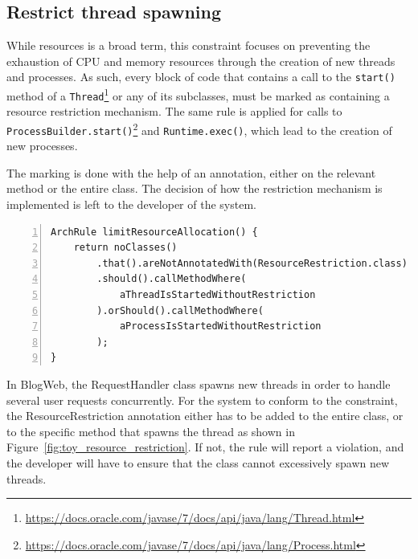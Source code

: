 \subsection{Restrict thread spawning}
While resources is a broad term, this constraint focuses on preventing the exhaustion of CPU and memory resources through the creation of new threads and processes. As such, every block of code that contains a call to the \texttt{start()} method of a \texttt{Thread}\footnote{\url{https://docs.oracle.com/javase/7/docs/api/java/lang/Thread.html}} or any of its subclasses, must be marked as containing a resource restriction mechanism. The same rule is applied for calls to \texttt{ProcessBuilder.start()}\footnote{\url{https://docs.oracle.com/javase/7/docs/api/java/lang/Process.html}\label{fnt:java_process}} and \texttt{Runtime.exec()}, which lead to the creation of new processes.

The marking is done with the help of an annotation, either on the relevant method or the entire class. The decision of how the restriction mechanism is implemented is left to the developer of the system.

\begin{minipage}{\linewidth}
\begin{lstlisting}[caption={Rule definition for constraint 5.}, captionpos=b, label=lst:constraint_5_impl, numbers=left]
ArchRule limitResourceAllocation() {
    return noClasses()
        .that().areNotAnnotatedWith(ResourceRestriction.class)
        .should().callMethodWhere(
            aThreadIsStartedWithoutRestriction
        ).orShould().callMethodWhere(
            aProcessIsStartedWithoutRestriction
        );
}
\end{lstlisting}
\end{minipage}

In BlogWeb, the RequestHandler class spawns new threads in order to handle several user requests concurrently. For the system to conform to the constraint, the ResourceRestriction annotation either has to be added to the entire class, or to the specific method that spawns the thread as shown in Figure~\ref{fig:toy_resource_restriction}. If not, the rule will report a violation, and the developer will have to ensure that the class cannot excessively spawn new threads.

